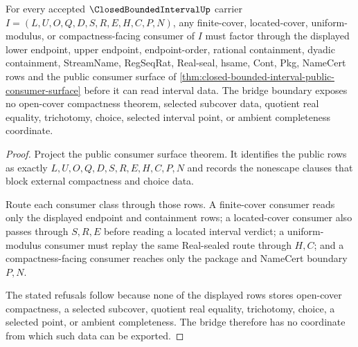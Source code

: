 \begin{theorem}
\label{thm:closed-bounded-interval-public-bridge-boundary}
For every accepted $\ClosedBoundedIntervalUp$ carrier $I=(L,U,O,Q,D,S,R,E,H,C,P,N)$, any finite-cover, located-cover, uniform-modulus, or compactness-facing consumer of $I$ must factor through the displayed lower endpoint, upper endpoint, endpoint-order, rational containment, dyadic containment, StreamName, RegSeqRat, Real-seal, hsame, Cont, Pkg, NameCert rows and the public consumer surface of \autoref{thm:closed-bounded-interval-public-consumer-surface} before it can read interval data. The bridge boundary exposes no open-cover compactness theorem, selected subcover data, quotient real equality, trichotomy, choice, selected interval point, or ambient completeness coordinate.
\end{theorem}
\begin{proof}
Project the public consumer surface theorem. It identifies the public rows as exactly $L,U,O,Q,D,S,R,E,H,C,P,N$ and records the nonescape clauses that block external compactness and choice data.

Route each consumer class through those rows. A finite-cover consumer reads only the displayed endpoint and containment rows; a located-cover consumer also passes through $S,R,E$ before reading a located interval verdict; a uniform-modulus consumer must replay the same Real-sealed route through $H,C$; and a compactness-facing consumer reaches only the package and NameCert boundary $P,N$.

The stated refusals follow because none of the displayed rows stores open-cover compactness, a selected subcover, quotient real equality, trichotomy, choice, a selected point, or ambient completeness. The bridge therefore has no coordinate from which such data can be exported.
\end{proof}
